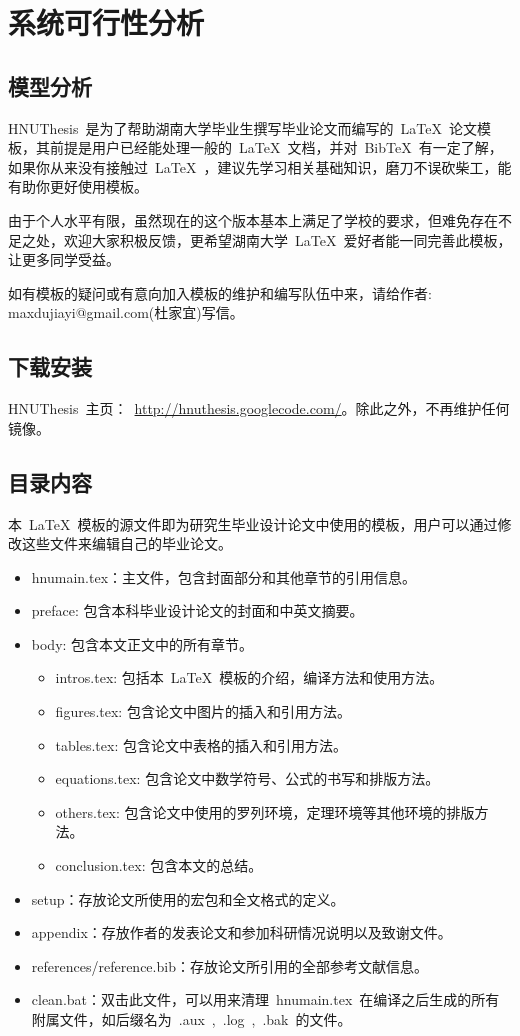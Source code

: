 
\chapter{系统可行性分析}


\section{模型分析}

HNUThesis~是为了帮助湖南大学毕业生撰写毕业论文而编写的~\LaTeX~论文模板，其前提是用户已经能处理一般的~\LaTeX~文档，并对~BibTeX~有一定了解，如果你从来没有接触过~\LaTeX~，建议先学习相关基础知识，磨刀不误砍柴工，能有助你更好使用模板。

由于个人水平有限，虽然现在的这个版本基本上满足了学校的要求，但难免存在不足之处，欢迎大家积极反馈，更希望湖南大学~\LaTeX~爱好者能一同完善此模板，让更多同学受益。

如有模板的疑问或有意向加入模板的维护和编写队伍中来，请给作者: maxdujiayi@gmail.com(杜家宜)写信。

\section{下载安装}
HNUThesis~主页：~\url{http://hnuthesis.googlecode.com/}。除此之外，不再维护任何镜像。

\section{目录内容}
本~\LaTeX{}~模板的源文件即为研究生毕业设计论文中使用的模板，用户可以通过修改这些文件来编辑自己的毕业论文。
\begin{itemize}
\item{hnumain.tex}：主文件，包含封面部分和其他章节的引用信息。
\item{preface}: 包含本科毕业设计论文的封面和中英文摘要。
\item{body}: 包含本文正文中的所有章节。
\begin{itemize}
\item{intros.tex}: 包括本~\LaTeX{}~模板的介绍，编译方法和使用方法。
\item{figures.tex}: 包含论文中图片的插入和引用方法。
\item{tables.tex}: 包含论文中表格的插入和引用方法。
\item{equations.tex}: 包含论文中数学符号、公式的书写和排版方法。
\item{others.tex}: 包含论文中使用的罗列环境，定理环境等其他环境的排版方法。
\item{conclusion.tex}: 包含本文的总结。
\end{itemize}
\item{setup}：存放论文所使用的宏包和全文格式的定义。
\item{appendix}：存放作者的发表论文和参加科研情况说明以及致谢文件。
\item{references/reference.bib}：存放论文所引用的全部参考文献信息。
\item{clean.bat}：双击此文件，可以用来清理~hnumain.tex~在编译之后生成的所有附属文件，如后缀名为~.aux~,~.log~,~.bak~的文件。
\end{itemize}

